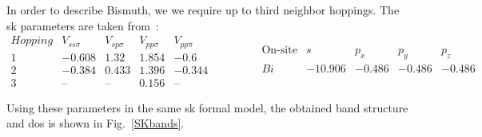 %
%
In order to describe Bismuth, we we require up to third neighbor hoppings. The \ac{sk} parameters are taken from~:
\begin{equation}
  \begin{array}{c|cccc}
    Hopping & V_{ss\sigma} & V_{sp\sigma} & V_{pp\sigma} & V_{pp\pi} \\ \hline
    1 & -0.608 & 1.32 & 1.854 & -0.6 \\
    2 & -0.384 & 0.433 & 1.396 & -0.344 \\
    3 & \text{--} & \text{--} & 0.156 & \text{--}
  \end{array}\qquad\qquad
  \begin{array}{c|cccc}
    \text{On-site} & s & p_x & p_y & p_z \\ \hline
    Bi & -10.906 & -0.486 & -0.486 & -0.486 \\
  \end{array}
\label{Bi_SK_params}
\end{equation}

Using these parameters in the same \ac{sk} formal model, the obtained band structure and \ac{dos} is shown in Fig.~\ref{SKbands}.

